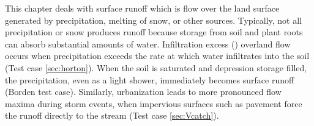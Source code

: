 \label{sec:Surface}
%

This chapter deals with surface runoff which is flow over the land surface generated by precipitation, melting of snow, or other sources.
%
Typically, not all precipitation or snow produces runoff because storage from soil and plant roots can absorb substantial amounts of water.
%
Infiltration excess (\cite{Horton:40}) overland flow occurs when precipitation exceeds the rate at which water infiltrates into the soil (Test case \ref{sec:horton}).
%
When the soil is saturated and depression storage filled, the precipitation, even as a light shower, immediately becomes surface runoff (Borden test case).
%
Similarly, urbanization leads to more pronounced flow maxima during storm events, when impervious surfaces such as pavement force the runoff directly to the stream (Test case \ref{sec:Vcatch}).

